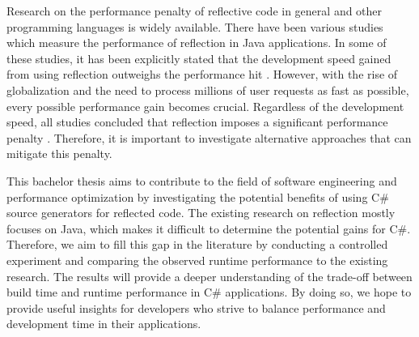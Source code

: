 Research on the performance penalty of reflective code in general and other programming languages is widely available. There have been various studies \cite{Forman2005EvaluatingPerformance, Halloway2001ReflectionInformIT, JavaReflection2013} which measure the performance of reflection in Java applications. In some of these studies, it has been explicitly stated that the development speed gained from using reflection outweighs the performance hit \cite{Halloway2001ReflectionInformIT}. However, with the rise of globalization and the need to process millions of user requests as fast as possible, every possible performance gain becomes crucial. Regardless of the development speed, all studies concluded that reflection imposes a significant performance penalty \cite{Forman2005EvaluatingPerformance, Halloway2001ReflectionInformIT, JavaReflection2013}. Therefore, it is important to investigate alternative approaches that can mitigate this penalty.

This bachelor thesis aims to contribute to the field of software engineering and performance optimization by investigating the potential benefits of using C\# source generators for reflected code. The existing research on reflection \cite{Forman2005EvaluatingPerformance, Halloway2001ReflectionInformIT, JavaReflection2013} mostly focuses on Java, which makes it difficult to determine the potential gains for C\#. Therefore, we aim to fill this gap in the literature by conducting a controlled experiment and comparing the observed runtime performance to the existing research. The results will provide a deeper understanding of the trade-off between build time and runtime performance in C\# applications. By doing so, we hope to provide useful insights for developers who strive to balance performance and development time in their applications.